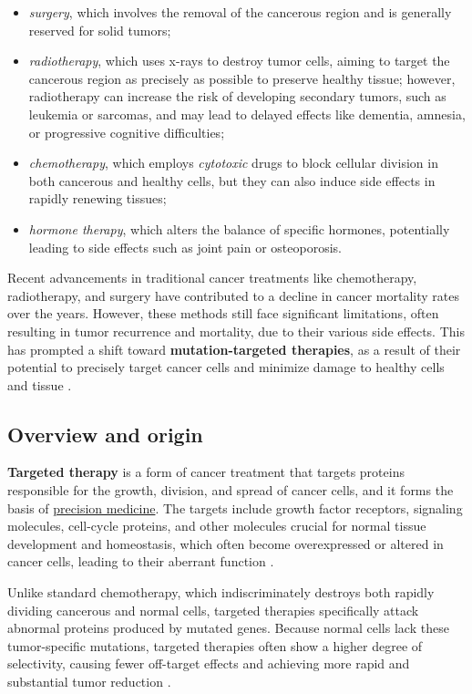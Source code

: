 \begin{itemize}
    \item \textit{surgery}, which involves the removal of the cancerous region and is generally reserved for solid tumors;
    \item \textit{radiotherapy}, which uses x-rays to destroy tumor cells, aiming to target the cancerous region as precisely as possible to preserve healthy tissue; however, radiotherapy can increase the risk of developing secondary tumors, such as leukemia or sarcomas, and may lead to delayed effects like dementia, amnesia, or progressive cognitive difficulties;
    \item \textit{chemotherapy}, which employs \textit{cytotoxic} drugs to block cellular division in both cancerous and healthy cells, but they can also induce side effects in rapidly renewing tissues;
    \item \textit{hormone therapy}, which alters the balance of specific hormones, potentially leading to side effects such as joint pain or osteoporosis.
\end{itemize}

Recent advancements in traditional cancer treatments like chemotherapy, radiotherapy, and surgery have contributed to a decline in cancer mortality rates over the years. However, these methods still face significant limitations, often resulting in tumor recurrence and mortality, due to their various side effects. This has prompted a shift toward \textbf{mutation-targeted therapies}, as a result of their potential to precisely target cancer cells and minimize damage to healthy cells and tissue \cite{target_therapy1, jci}.

\subsection{Overview and origin}

\textbf{Targeted therapy} is a form of cancer treatment that targets proteins responsible for the growth, division, and spread of cancer cells, and it forms the basis of \href{https://en.wikipedia.org/wiki/Personalized_medicine}{precision medicine}. The targets include growth factor receptors, signaling molecules, cell-cycle proteins, and other molecules crucial for normal tissue development and homeostasis, which often become overexpressed or altered in cancer cells, leading to their aberrant function \cite{se_tt}.

Unlike standard chemotherapy, which indiscriminately destroys both rapidly dividing cancerous and normal cells, targeted therapies specifically attack abnormal proteins produced by mutated genes. Because normal cells lack these tumor-specific mutations, targeted therapies often show a higher degree of selectivity, causing fewer off-target effects and achieving more rapid and substantial tumor reduction \cite{jci}.

